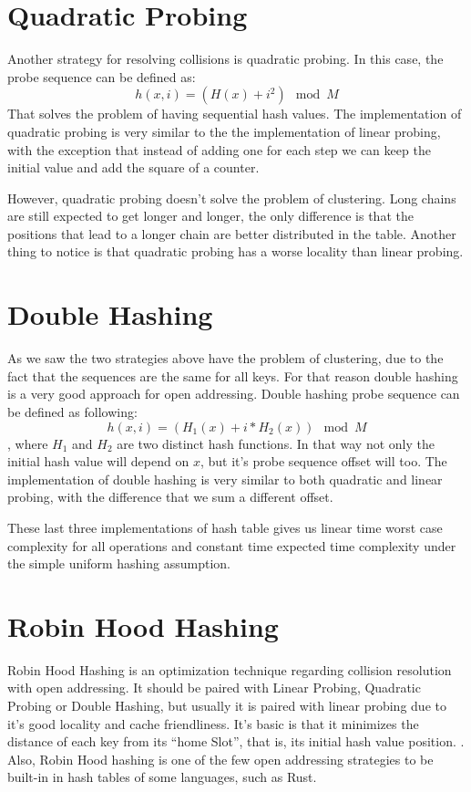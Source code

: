 \section{Quadratic Probing}

Another strategy for resolving collisions is quadratic probing. In this case, the probe sequence can be defined as:
\[ h(x, i) = (H(x) + i^2) \mod M \]
That solves the problem of having sequential hash values. The implementation of quadratic probing is very similar to the the implementation of linear probing, with the exception that instead of adding one for each step we can keep the initial value and add the square of a counter.

However, quadratic probing doesn't solve the problem of clustering. Long chains are still expected to get longer and longer, the only difference is that the positions that lead to a longer chain are better distributed in the table. Another thing to notice is that quadratic probing has a worse locality than linear probing. 

\section{Double Hashing}

As we saw the two strategies above have the problem of clustering, due to the fact that the sequences are the same for all keys. For that reason double hashing is a very good approach for open addressing. Double hashing probe sequence can be defined as following:
\[ h(x, i) = (H_1(x) + i * H_2(x)) \mod M \],
where \( H_1 \) and \( H_2 \) are two distinct hash functions. In that way not only the initial hash value will depend on \( x \), but it's probe sequence offset will too. The implementation of double hashing is very similar to both quadratic and linear probing, with the difference that we sum a different offset.

These last three implementations of hash table gives us linear time worst case complexity for all operations and constant time expected time complexity under the simple uniform hashing assumption.

\section{Robin Hood Hashing}

Robin Hood Hashing is an optimization technique regarding collision resolution with open addressing. It should be paired with Linear Probing, Quadratic Probing or Double Hashing, but usually it is paired with linear probing due to it's good locality and cache friendliness. It's basic is that it minimizes the distance of each key from its ``home Slot'', that is, its initial hash value position. \citep{RobinHoodHashing}. Also, Robin Hood hashing is one of the few open addressing strategies to be built-in in hash tables of some languages, such as Rust.

